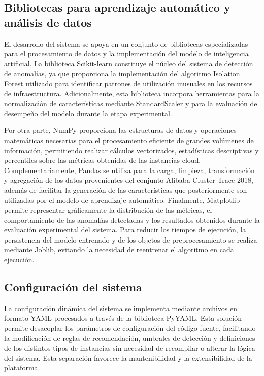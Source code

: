 \subsection{Bibliotecas para aprendizaje automático y análisis de datos}

El desarrollo del sistema se apoya en un conjunto de bibliotecas
especializadas para el procesamiento de datos y la implementación del
modelo de inteligencia artificial. La biblioteca Scikit-learn constituye
el núcleo del sistema de detección de anomalías, ya que proporciona la
implementación del algoritmo Isolation Forest utilizado para identificar
patrones de utilización inusuales en los recursos de infraestructura.
Adicionalmente, esta biblioteca incorpora herramientas para la
normalización de características mediante StandardScaler y para la
evaluación del desempeño del modelo durante la etapa experimental.

Por otra parte, NumPy proporciona las estructuras de datos y operaciones
matemáticas necesarias para el procesamiento eficiente de grandes
volúmenes de información, permitiendo realizar cálculos vectorizados,
estadísticas descriptivas y percentiles sobre las métricas obtenidas de
las instancias cloud. Complementariamente, Pandas se utiliza para la
carga, limpieza, transformación y agregación de los datos provenientes
del conjunto Alibaba Cluster Trace 2018, además de facilitar la
generación de las características que posteriormente son utilizadas por
el modelo de aprendizaje automático. Finalmente, Matplotlib permite
representar gráficamente la distribución de las métricas, el
comportamiento de las anomalías detectadas y los resultados obtenidos
durante la evaluación experimental del sistema. Para reducir los tiempos
de ejecución, la persistencia del modelo entrenado y de los objetos de
preprocesamiento se realiza mediante Joblib, evitando la necesidad de
reentrenar el algoritmo en cada ejecución.

\subsection{Configuración del sistema}

La configuración dinámica del sistema se implementa mediante archivos en
formato YAML procesados a través de la biblioteca PyYAML. Esta solución
permite desacoplar los parámetros de configuración del código fuente,
facilitando la modificación de reglas de recomendación, umbrales de
detección y definiciones de los distintos tipos de instancias sin
necesidad de recompilar o alterar la lógica del sistema. Esta separación
favorece la mantenibilidad y la extensibilidad de la plataforma.

